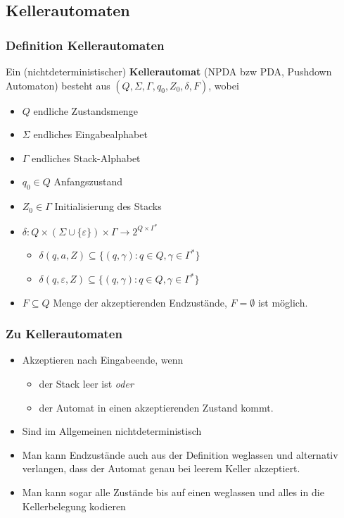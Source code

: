 \subsection{Kellerautomaten}
\begin{frame}
	\frametitle{Definition Kellerautomaten}
	Ein (nichtdeterministischer) \textbf{Kellerautomat} (NPDA bzw PDA, Pushdown Automaton) besteht aus $(Q, \Sigma, \Gamma, q_0, Z_0,\delta, F)$, wobei
	\begin{itemize}
		\item $Q$ endliche Zustandsmenge
		\item $\Sigma$ endliches Eingabealphabet
		\item $\Gamma$ endliches Stack-Alphabet
		\item $q_0 \in Q$ Anfangszustand
		\item $Z_0 \in \Gamma$ Initialisierung des Stacks
		\item $\delta : Q \times ( \Sigma \cup \{\varepsilon\}) \times \Gamma \rightarrow 2^{Q \times \Gamma^*}$
		\begin{itemize}
			\item $\delta(q, a, Z) \subseteq \{(q,\gamma) : q \in Q, \gamma \in \Gamma^*\}$
			\item $\delta(q, \varepsilon, Z) \subseteq \{(q,\gamma) : q \in Q, \gamma \in \Gamma^*\}$
		\end{itemize}
		\item $F \subseteq Q$ Menge der akzeptierenden Endzustände, $F=\emptyset$ ist möglich.
		
		\vspace{-4cm}
	\end{itemize}
\end{frame}

\begin{frame}
\frametitle{Zu Kellerautomaten}
\begin{itemize}
\item Akzeptieren nach Eingabeende, wenn \begin{itemize}
	\item der Stack leer ist \emph{oder}
	\item der Automat in einen akzeptierenden Zustand kommt.
\end{itemize}
\item Sind im Allgemeinen nichtdeterministisch
\item Man kann Endzustände auch aus der Definition weglassen und alternativ verlangen, dass der Automat genau bei leerem Keller akzeptiert.
\item Man kann sogar alle Zustände bis auf einen weglassen und alles in die Kellerbelegung kodieren
\end{itemize}
\end{frame}

